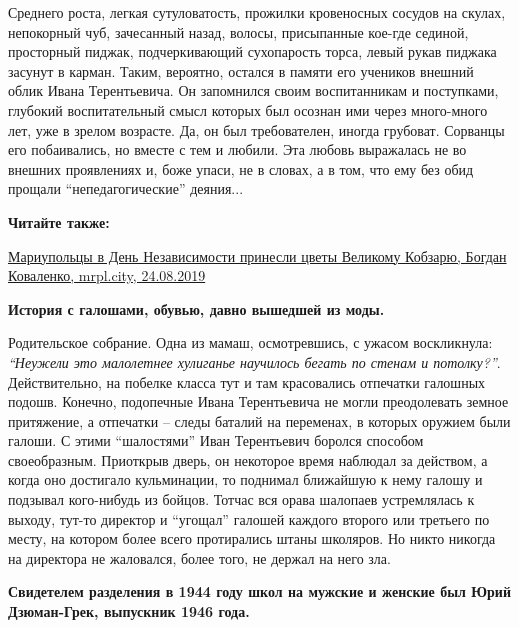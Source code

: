 
Среднего роста, легкая сутуловатость, прожилки кровеносных сосудов на скулах,
непокорный чуб, зачесанный назад, волосы, присыпанные кое-где сединой,
просторный пиджак, подчеркивающий сухопарость торса, левый рукав пиджака
засунут в карман. Таким, вероятно, остался в памяти его учеников внешний облик
Ивана Терентьевича. Он запомнился своим воспитанникам и поступками, глубокий
воспитательный смысл которых был осознан ими через много-много лет, уже в
зрелом возрасте. Да, он был требователен, иногда грубоват. Сорванцы его
побаивались, но вместе с тем и любили. Эта любовь выражалась не во внешних
проявлениях и, боже упаси, не в словах, а в том, что ему без обид прощали
\enquote{непедагогические} деяния...

\textbf{Читайте также:} 

\href{https://mrpl.city/news/view/mariupoltsy-v-den-nezavisimosti-prinesli-tsvety-velikomu-kobzaryu-fotofakt-1}{%
Мариупольцы в День Независимости принесли цветы Великому Кобзарю, Богдан Коваленко, mrpl.city, 24.08.2019}


\textbf{История с галошами, обувью, давно вышедшей из моды.}

Родительское собрание. Одна из мамаш, осмотревшись, с ужасом воскликнула:
\emph{\enquote{Неужели это малолетнее хулиганье научилось бегать по стенам и потолку?}}.
Действительно, на побелке класса тут и там красовались отпечатки галошных
подошв. Конечно, подопечные Ивана Терентьевича не могли преодолевать земное
притяжение, а отпечатки – следы баталий на переменах, в которых оружием были
галоши. С этими \enquote{шалостями} Иван Терентьевич боролся способом своеобразным.
Приоткрыв дверь, он некоторое время наблюдал за действом, а когда оно достигало
кульминации, то поднимал ближайшую к нему галошу и подзывал кого-нибудь из
бойцов. Тотчас вся орава шалопаев устремлялась к выходу, тут-то директор и
\enquote{угощал} галошей каждого второго или третьего по месту, на котором более всего
протирались штаны школяров. Но никто никогда на директора не жаловался, более
того, не держал на него зла.

\textbf{Свидетелем разделения в 1944 году школ на мужские и женские был Юрий Дзюман-Грек, выпускник 1946 года.}

